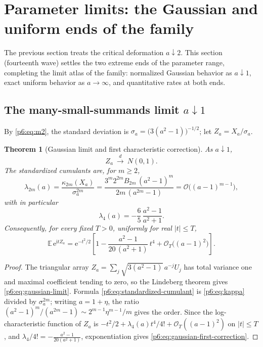 \documentclass[11pt,oneside]{article}
\numberwithin{equation}{section}
\newtheorem{theorem}{Theorem}[section]
\theoremstyle{definition}
\theoremstyle{remark}
\newcommand{\E}{\mathbb E}
\newcommand{\e}{\mathrm e}
\newcommand{\ii}{\mathrm i}
\newcommand{\bigO}{\mathcal O}
\begin{document}
\section{Parameter limits: the Gaussian and uniform ends of the family}
\label{p6:sec:parameter-limits}

The previous section treats the critical deformation $a\downarrow2$.  This
section (fourteenth wave) settles the two extreme ends of the parameter range,
completing the limit atlas of the family: normalized Gaussian behavior as
$a\downarrow1$, exact uniform behavior as $a\to\infty$, and quantitative rates
at both ends.

\subsection{The many-small-summands limit \texorpdfstring{$a\downarrow1$}{a down to 1}}

By \eqref{p6:eq:m2}, the standard deviation is
$\sigma_a=\bigl(3(a^2-1)\bigr)^{-1/2}$; let $Z_a=X_a/\sigma_a$.

\begin{theorem}[Gaussian limit and first characteristic correction]
\label{p6:thm:gaussian-limit}
As $a\downarrow1$,
\begin{equation}\label{p6:eq:gaussian-limit}
 Z_a\ \xrightarrow{\ d\ }\ N(0,1).
\end{equation}
The standardized cumulants are, for $m\ge2$,
\begin{equation}\label{p6:eq:standardized-cumulant}
 \lambda_{2m}(a)
 =\frac{\kappa_{2m}(X_a)}{\sigma_a^{2m}}
 =\frac{3^m2^{2m}B_{2m}\,(a^2-1)^m}{2m\,(a^{2m}-1)}
 =\bigO\bigl((a-1)^{m-1}\bigr),
\end{equation}
with in particular
\begin{equation}\label{p6:eq:lambda4}
 \lambda_4(a)=-\frac65\,\frac{a^2-1}{a^2+1}.
\end{equation}
Consequently, for every fixed $T>0$, uniformly for real $|t|\le T$,
\begin{equation}\label{p6:eq:gaussian-first-correction}
 \E\,\e^{\ii tZ_a}
 =\e^{-t^2/2}
 \left[1-\frac{a^2-1}{20\,(a^2+1)}\,t^4
 +\bigO_T\bigl((a-1)^2\bigr)\right].
\end{equation}
\end{theorem}

\begin{proof}
The triangular array $Z_a=\sum_j\sqrt{3(a^2-1)}\,a^{-j}U_j$ has total variance
one and maximal coefficient tending to zero, so the Lindeberg theorem gives
\eqref{p6:eq:gaussian-limit}.  Formula \eqref{p6:eq:standardized-cumulant} is
\eqref{p6:eq:kappa} divided by $\sigma_a^{2m}$; writing $a=1+\eta$, the ratio
$(a^2-1)^m/(a^{2m}-1)\sim2^{m-1}\eta^{m-1}/m$ gives the order.  Since the
log-characteristic function of $Z_a$ is
$-t^2/2+\lambda_4(a)t^4/4!+\bigO_T((a-1)^2)$ on $|t|\le T$, and
$\lambda_4/4!=-\tfrac{a^2-1}{20(a^2+1)}$, exponentiation gives
\eqref{p6:eq:gaussian-first-correction}.
\end{proof}
\end{document}
